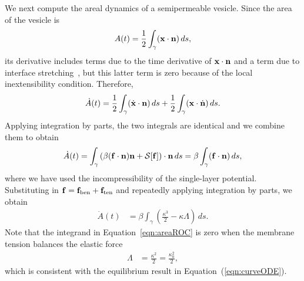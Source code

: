\documentclass[prb,preprint,showpacs,preprintnumbers,amsmath,amssymb,longbibliography]{revtex4-1}
\begin{document}
We next compute the areal dynamics of a semipermeable vesicle. Since the
area of the vesicle is
\begin{align}
  A(t) = \frac{1}{2}\int_{\gamma} (\mathbf{x} \cdot \mathbf{n})\, ds,
  \label{eqn:area}
\end{align}
its derivative includes terms due to the time derivative of $\mathbf{x} \cdot
\mathbf{n}$ and a term due to interface stretching~\cite{lai-tse-hua2008}, but
this latter term is zero because of the local inextensibility condition.
Therefore,
\begin{align}
  \dot{A}(t) =
  \frac{1}{2} \int_{\gamma} (\dot{\mathbf{x}} \cdot \mathbf{n})\, ds  + 
  \frac{1}{2} \int_{\gamma} (\mathbf{x} \cdot \dot{\mathbf{n}})\, ds.
\end{align}
Applying integration by parts, the two integrals are identical and we combine them to obtain
\begin{align}
  \dot{A}(t) = \int_\gamma \left(\beta (\mathbf{f} \cdot \mathbf{n})\mathbf{n} 
    + \mathcal{S}[\mathbf{f}]\right) \cdot \mathbf{n}\, ds 
  = \beta \int_\gamma (\mathbf{f} \cdot \mathbf{n})\, ds,
\end{align}
where we have used the incompressibility of the single-layer potential.
Substituting in $\mathbf{f} = \mathbf{f}_\mathrm{ben} + \mathbf{f}_\mathrm{ten}$ and
repeatedly applying integration by parts, we obtain
\begin{align}
  \dot{A}(t) & = \beta \int_\gamma \left(
    \frac{\kappa^3}{2} - \kappa \Lambda \right) \, ds.
  \label{eqn:areaROC}
\end{align}
Note that the integrand in Equation~\eqref{eqn:areaROC} is zero when the membrane tension balances the elastic force
\begin{align}
\label{eqn:areaROC2}
\Lambda &= \frac{\kappa^2}{2}=\frac{\kappa_0^2}{2},
\end{align}
which is consistent with the equilibrium result in
Equation~(\ref{eqn:curveODE}).
\end{document}
